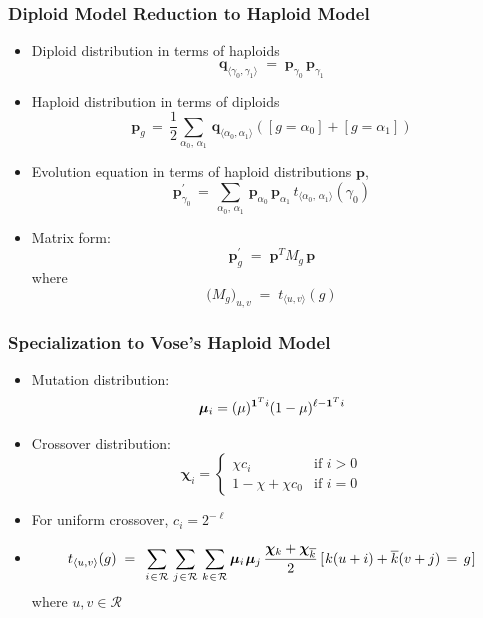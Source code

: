\documentclass[aspectratio=169]{beamer}
\newcommand{\nudge}{\hspace{0.01in}}
\begin{document}
  \begin{frame}
    \frametitle{Diploid Model Reduction to Haploid Model}
    \begin{itemize}
      \item{Diploid distribution in terms of haploids
      \[\bm{q}_{\langle \gamma_0, \gamma_1 \rangle}\; = \;
      \bm{p}_{\gamma_0} \, \bm{p}_{\gamma_1}\]}
      \item{Haploid distribution in terms of diploids
      \[ \bm{p}_g \, = \, \frac{1}{2} \sum_{\alpha_0, \, \alpha_1} \, \bm{q}_{\langle \alpha_0, \alpha_1 \rangle}
	    ([g = \alpha_0] + [g = \alpha_1]) \]}
      \item{Evolution equation in terms of haploid distributions $\bm{p}$,
      \[\bm{p}_{\gamma_0}^{\prime} \,=\, \sum_{\alpha_0, \, \alpha_1} \, \bm{p}_{\alpha_0} \, \bm{p}_{\alpha_1} \,
	  t_{\langle \alpha_0, \,\alpha_1 \rangle}(\gamma_0) \]}
      \item{Matrix form:
      \[ \bm{p}_g^\prime \; = \; \bm{p}^T M_g \, \bm{p} \] where \[ \Big(M_g \Big)_{u,v} \; = \; t_{\langle u, v \rangle}(g) \]}
    \end{itemize}
  \end{frame}
  
  \begin{frame}
    \frametitle{Specialization to Vose's Haploid Model}
    \begin{itemize}
      \item{Mutation distribution: \[\bm{\mu}_i = (\mu)^{{\bf 1}^Ti} (1-\mu)^{\ell- {\bf 1}^Ti} \]}
      \item{Crossover distribution: \[
	\bm{\chi}_i =\begin{cases}
	  \chi c_i & \text{if $i>0$}\\
	  1 - \chi + \chi  c_0 & \text{if $i = 0$}
	\end{cases}
      \]}
      \item{For uniform crossover, $c_i = 2^{-\ell}$}
      \item{\[ t_{\langle u,v \rangle}(g) \; = \;\,
      \sum_{i \nudge \in \nudge \mathcal{R}} \, \sum_{j \nudge \in \nudge \mathcal{R}} \,
      \sum_{k \nudge \in \nudge \mathcal{R}}
      \bm{\mu}_i \nudge \bm{\mu}_j \, \frac{\bm{\chi}_k + \bm{\chi}_{\overline{k}}}{2} \,
      [\nudge k (u + i) + \overline{k}(v + j) \, = \, g\nudge] \] where $u,v \in \mathcal{R}$}
      
    \end{itemize}
  \end{frame}
  
\end{document}
